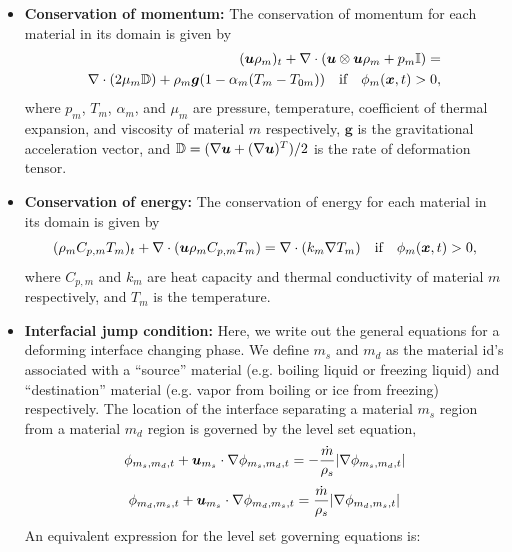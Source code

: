 \documentclass[]{article}
\newcommand{\mb}{\mathbf}
\newcommand{\tn}{\textnormal}
\newcommand{\bmg}{\mbox{\boldmath $g$\unboldmath}}
\newcommand{\bmu}{\mbox{\boldmath $u$\unboldmath}}
\newcommand{\bmx}{\mbox{\boldmath $x$\unboldmath}}
\newcommand{\DefTen}{\mathbb{D}}
\newcommand{\EyeTen}{\mathbb{I}}
\begin{document}
\begin{itemize}
\item \textbf{Conservation of momentum:}
The conservation of momentum for each material in its domain is given by
\begin{eqnarray}
 (\bmu\rho_{m})_{t}+
  \nabla\cdot(\bmu \otimes \bmu \rho_{m}+p_{m} \EyeTen)=
  \label{eq:NS} \\
  \nabla\cdot(2\mu_{m}\DefTen)+
  \rho_{m}\bmg (1-\alpha_{m}(T_{m}-T_{0m}))
  \hspace{10pt} \tn{if} \hspace{10pt} \phi_{m}(\bmx,t)>0,
  \nonumber
\end{eqnarray}
where $p_{m}$, $T_{m}$, $\alpha_{m}$, and $\mu_{m}$ are 
pressure, temperature, coefficient of thermal expansion, and 
viscosity of material $m$ respectively, 
$\mb{g}$ is the gravitational acceleration vector, and 
$\DefTen= (\nabla\bmu+(\nabla\bmu)^{T})/2$ is the rate of deformation tensor. 
\item \textbf{Conservation of energy:} 
The conservation of energy for each material in its domain is given by
\begin{equation}
  \label{eq:heat}
  (\rho_{m}C_{p,m}T_{m})_t+
  \nabla\cdot(\bmu\rho_{m}C_{p,m}T_{m})=
  \nabla\cdot ( k_{m}\nabla T_{m})
  \hspace{10pt} \tn{if} \hspace{10pt} \phi_{m}(\bmx,t)>0,
\end{equation}
where $C_{p,m}$ and $k_{m}$ are heat capacity and thermal conductivity of 
material $m$ respectively, and $T_{m}$ is the temperature. 
\item \textbf{Interfacial jump condition:}
Here, we write out the general equations for a deforming
interface changing phase.  We define $m_{s}$ and $m_{d}$ as
the material id's associated with a ``source'' material 
(e.g. boiling liquid or freezing liquid)
and ``destination'' material (e.g. vapor from boiling or ice from freezing) 
respectively.
The location of the interface separating a material $m_{s}$ region from a
material $m_{d}$ region is governed by the level set equation,
\begin{eqnarray}
\phi_{m_{s},m_{d},t} + 
\bmu_{m_{s}}\cdot\nabla\phi_{m_{s},m_{d},t} =
-\frac{\dot{m}}{\rho_{s}}|\nabla\phi_{m_{s},m_{d},t}|
\end{eqnarray}
\begin{eqnarray}
\phi_{m_{d},m_{s},t} + 
\bmu_{m_{s}}\cdot\nabla\phi_{m_{d},m_{s},t} =
\frac{\dot{m}}{\rho_{s}}|\nabla\phi_{m_{d},m_{s},t}|
\end{eqnarray}
An equivalent expression for the level set governing equations is:

\end{itemize}
\end{document}

